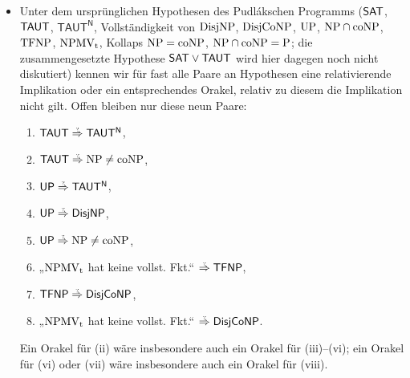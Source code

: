 \begin{itemize}[parsep=0pt,listparindent=\parindent,itemsep=5pt plus 1pt minus 1pt,midpenalty=0]
    \item Unter dem ursprünglichen Hypothesen des Pudlákschen Programms ($\mathsf{SAT}$, $ \mathsf{TAUT}$, $ \mathsf{TAUT^N}$, Vollständigkeit von $\mathrm{DisjNP}$, $ \mathrm{DisjCoNP}$, $ \mathrm{UP}$, $ \mathrm{NP}\cap\mathrm{coNP}$, $ \mathrm{TFNP}$, $ \mathrm{NPMV_t}$, Kollaps $\mathrm{NP}=\mathrm{coNP}$, $\mathrm{NP}\cap\mathrm{coNP}=\mathrm{P}$; die zusammengesetzte Hypothese $\mathsf{SAT}\lor\mathsf{TAUT}$ wird hier dagegen noch nicht diskutiert) kennen wir für fast alle Paare an Hypothesen eine relativierende Implikation oder ein entsprechendes Orakel, relativ zu diesem die Implikation nicht gilt. Offen bleiben nur diese neun Paare:
        \begin{enumerate}[noitemsep,midpenalty=0,label=(\roman*)]
            \item $\hTAUT\stackrel{\smash{\text{\raisebox{-1pt}{\tiny ?}}}}{\Rightarrow}\mathsf{TAUT^N}$,
            \item $\hTAUT\stackrel{\smash{\text{\raisebox{-1pt}{\tiny ?}}}}{\Rightarrow}\NP\neq\coNP$,
            \item $\hUP\stackrel{\smash{\text{\raisebox{-1pt}{\tiny ?}}}}{\Rightarrow}\mathsf{TAUT^N}$,
            \item $\hUP\stackrel{\smash{\text{\raisebox{-1pt}{\tiny ?}}}}{\Rightarrow}\hDisjNP$,
            \item $\hUP\stackrel{\smash{\text{\raisebox{-1pt}{\tiny ?}}}}{\Rightarrow}\NP\neq\coNP$,
            \item „$\mathrm{NPMV_t}$ hat keine vollst. Fkt.“ $\stackrel{\smash{\text{\raisebox{-1pt}{\tiny ?}}}}{\Rightarrow} \hTFNP$,
            \item $\hTFNP\stackrel{\smash{\text{\raisebox{-1pt}{\tiny ?}}}}{\Rightarrow} \hDisjCoNP$,
            \item „$\mathrm{NPMV_t}$ hat keine vollst. Fkt.“ $\stackrel{\smash{\text{\raisebox{-1pt}{\tiny ?}}}}{\Rightarrow} \hDisjCoNP$.

        \end{enumerate}
        Ein Orakel für (ii) wäre insbesondere auch ein Orakel für (iii)–(vi); ein Orakel für (vi) oder (vii) wäre insbesondere auch ein Orakel für (viii).
        

\end{itemize}

